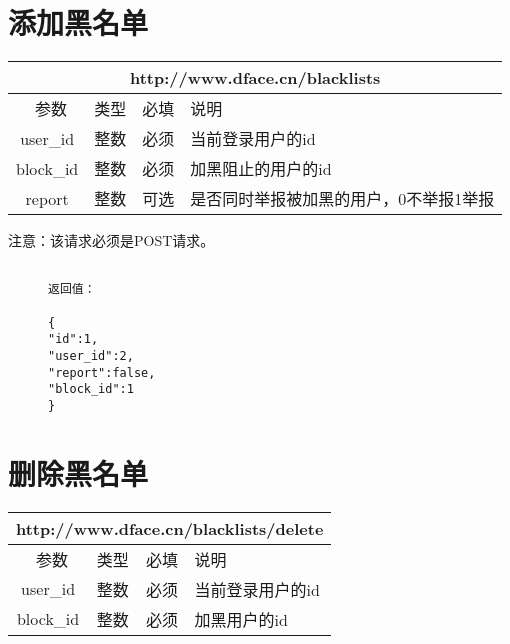 \documentclass[cs4size]{ctexartutf8}
\begin{document}
\section{添加黑名单}

\begin{table}[H]
   \begin{center}
\begin{tabular}{|c|c|c|p{12cm}|}
\hline
\multicolumn{4}{|c|}{http://www.dface.cn/blacklists} \\
\hline\hline
 \  参数  & 类型 & 必填 &  说明  \\
\hline
 user\_id  & 整数 & 必须 &  当前登录用户的id\\
\hline
 block\_id  & 整数 & 必须 &  加黑阻止的用户的id\\
 \hline
 report  & 整数 & 可选 &  是否同时举报被加黑的用户，0不举报1举报\\
\hline
\end{tabular}
   \end{center}
\end{table}

注意：该请求必须是POST请求。

\begin{figure}[H]
\begin{verbatim}

返回值：

{
"id":1,
"user_id":2,
"report":false,
"block_id":1
}

\end{verbatim}
\end{figure}



\section{删除黑名单}

\begin{table}[H]
   \begin{center}
\begin{tabular}{|c|c|c|p{12cm}|}
\hline
\multicolumn{4}{|c|}{http://www.dface.cn/blacklists/delete} \\
\hline\hline
 \  参数  & 类型 & 必填 &  说明  \\
\hline
 user\_id  & 整数 & 必须 &  当前登录用户的id\\
\hline
 block\_id  & 整数 & 必须 &  加黑用户的id\\
\hline
\end{tabular}
   \end{center}
\end{table}
\end{document}
